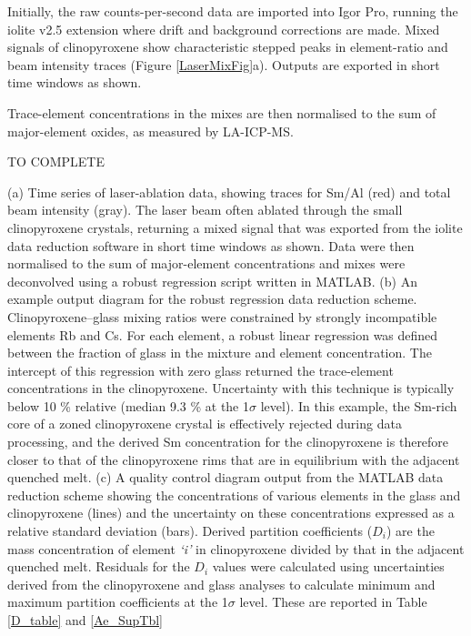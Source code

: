 Initially, the raw counts-per-second data are imported into Igor Pro, running the iolite v2.5 extension \citep{Paton2011} where drift and background corrections are made. Mixed signals of clinopyroxene show characteristic stepped peaks in element-ratio and beam intensity traces (Figure \ref{LaserMixFig}a). Outputs are exported in short time windows as shown.

Trace-element concentrations in the mixes are then normalised to the sum of major-element oxides, as measured by LA-ICP-MS.

TO COMPLETE


(a) Time series of laser-ablation data, showing traces for Sm/Al (red) and total beam intensity (gray). The laser beam often ablated through the small clinopyroxene crystals, returning a mixed signal that was exported from the iolite data reduction software in short time windows as shown. Data were then normalised to the sum of major-element concentrations and mixes were deconvolved using a robust regression script written in MATLAB. (b) An example output diagram for the robust regression data reduction scheme. Clinopyroxene--glass mixing ratios were constrained by strongly incompatible elements Rb and Cs. For each element, a robust linear regression was defined between the fraction of glass in the mixture and element concentration. The intercept of this regression with zero glass returned the trace-element concentrations in the clinopyroxene. Uncertainty with this technique is typically below 10 \% relative (median 9.3 \% at the 1$\sigma$ level). In this example, the Sm-rich core of a zoned clinopyroxene crystal is effectively rejected during data processing, and the derived Sm concentration for the clinopyroxene is therefore closer to that of the clinopyroxene rims that are in equilibrium with the adjacent quenched melt. (c) A quality control diagram output from the MATLAB data reduction scheme showing the concentrations of various elements in the glass and clinopyroxene (lines) and the uncertainty on these concentrations expressed as a relative standard deviation (bars). Derived partition coefficients ($D_i$) are the mass concentration of element \emph{`i'} in clinopyroxene divided by that in the adjacent quenched melt. Residuals for the $D_i$ values were calculated using uncertainties derived from the clinopyroxene and glass analyses to calculate minimum and maximum partition coefficients at the 1$\sigma$ level. These are reported in Table \ref{D_table} and \ref{Ae_SupTbl}
